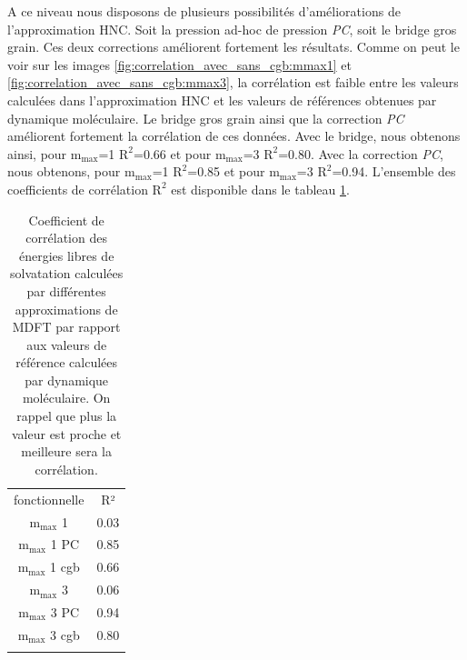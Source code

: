 A ce niveau nous disposons de plusieurs possibilités d'améliorations de l'approximation HNC. Soit la pression ad-hoc de pression \textit{PC}, soit le bridge gros grain. Ces deux corrections améliorent fortement les résultats. Comme on peut le voir sur les images \ref{fig:correlation_avec_sans_cgb:mmax1} et \ref{fig:correlation_avec_sans_cgb:mmax3}, la corrélation est faible entre les valeurs calculées dans l'approximation HNC et les valeurs de références obtenues par dynamique moléculaire. 
Le bridge gros grain ainsi que la correction \textit{PC} améliorent fortement la corrélation de ces données. Avec le bridge, nous obtenons ainsi, pour $\mathrm{m}_\mathrm{max}$=1 $\mathrm{R}^2$=0.66 et pour $\mathrm{m}_\mathrm{max}$=3 $\mathrm{R}^2$=0.80. Avec la correction \textit{PC}, nous obtenons, pour $\mathrm{m}_\mathrm{max}$=1 $\mathrm{R}^2$=0.85 et pour $\mathrm{m}_\mathrm{max}$=3 $\mathrm{R}^2$=0.94. L'ensemble des coefficients de corrélation $\mathrm{R}^2$ est disponible dans le tableau \ref{tab:correlation}.



\begin{table}[H]
  \begin{center}
    \begin{tabular}{ c c }
      \hline & \\[-1em]\hline
       fonctionnelle  & R²  \\
      \hline
       $\mathrm{m}_\mathrm{max}$ 1      & 0.03  \\
       $\mathrm{m}_\mathrm{max}$ 1 PC   & 0.85  \\
       $\mathrm{m}_\mathrm{max}$ 1 cgb  & 0.66  \\
       $\mathrm{m}_\mathrm{max}$ 3      & 0.06  \\
       $\mathrm{m}_\mathrm{max}$ 3 PC   & 0.94  \\
       $\mathrm{m}_\mathrm{max}$ 3 cgb  & 0.80  \\
      \hline & \\[-1em]\hline%
    \end{tabular}
  \end{center}
  \caption[Coefficient de corrélation des énergies libres de solvatation calculées par MDFT par rapport aux valeurs calculées par DM.]{Coefficient de corrélation des énergies libres de solvatation calculées par différentes approximations de MDFT par rapport aux valeurs de référence calculées par dynamique moléculaire. On rappel que plus la valeur est proche et meilleure sera la corrélation.}
  \label{tab:correlation}  
\end{table}



